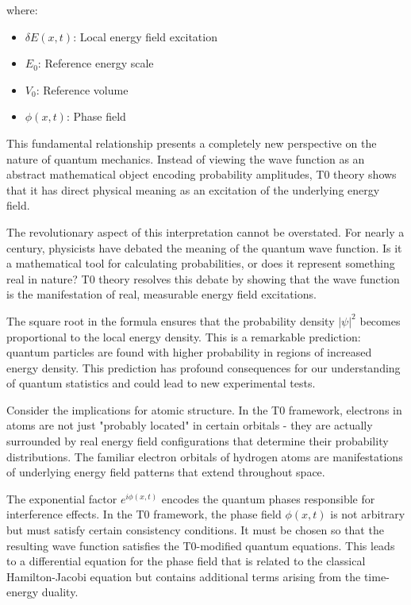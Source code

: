 \documentclass[12pt,a4paper]{article}
\newcommand{\deltaE}{\delta E}
\theoremstyle{definition}
\theoremstyle{remark}
\begin{document}
where:
\begin{itemize}
	\item $\deltaE(x,t)$: Local energy field excitation
	\item $E_0$: Reference energy scale
	\item $V_0$: Reference volume
	\item $\phi(x,t)$: Phase field
\end{itemize}

This fundamental relationship presents a completely new perspective on the nature of quantum mechanics. Instead of viewing the wave function as an abstract mathematical object encoding probability amplitudes, T0 theory shows that it has direct physical meaning as an excitation of the underlying energy field.

The revolutionary aspect of this interpretation cannot be overstated. For nearly a century, physicists have debated the meaning of the quantum wave function. Is it a mathematical tool for calculating probabilities, or does it represent something real in nature? T0 theory resolves this debate by showing that the wave function is the manifestation of real, measurable energy field excitations.

The square root in the formula ensures that the probability density $|\psi|^2$ becomes proportional to the local energy density. This is a remarkable prediction: quantum particles are found with higher probability in regions of increased energy density. This prediction has profound consequences for our understanding of quantum statistics and could lead to new experimental tests.

Consider the implications for atomic structure. In the T0 framework, electrons in atoms are not just "probably located" in certain orbitals - they are actually surrounded by real energy field configurations that determine their probability distributions. The familiar electron orbitals of hydrogen atoms are manifestations of underlying energy field patterns that extend throughout space.

The exponential factor $e^{i\phi(x,t)}$ encodes the quantum phases responsible for interference effects. In the T0 framework, the phase field $\phi(x,t)$ is not arbitrary but must satisfy certain consistency conditions. It must be chosen so that the resulting wave function satisfies the T0-modified quantum equations. This leads to a differential equation for the phase field that is related to the classical Hamilton-Jacobi equation but contains additional terms arising from the time-energy duality.
\end{document}

